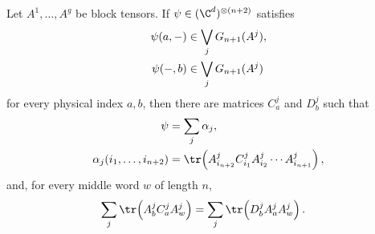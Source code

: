\begin{lemma}
    \label{lem:pgvwc07_trace_decompositions_from_block_restrictions}
    \leanok
    Let $A^1,\ldots,A^g$ be block tensors. If
    $\psi\in(\C^d)^{\otimes(n+2)}$ satisfies
    \begin{align}
        \psi(a,-) & \in\bigvee_jG_{n+1}(A^j),
        \notag                                \\
        \psi(-,b) & \in\bigvee_jG_{n+1}(A^j)
        \notag
    \end{align}
    for every physical index $a,b$, then there are matrices $C^j_a$ and
    $D^j_b$ such that
    \begin{align}
        \psi & =\sum_j\alpha_j, \notag \\
        \alpha_j(i_1,\ldots,i_{n+2})
             & =
        \tr\!\left(A^j_{i_{n+2}}C^j_{i_1}
        A^j_{i_2}\cdots A^j_{i_{n+1}}\right), \notag
    \end{align}
    and, for every middle word $w$ of length $n$,
    \begin{align}
        \sum_j\tr\!\left(A^j_bC^j_aA^j_w\right)
         & =
        \sum_j\tr\!\left(D^j_bA^j_aA^j_w\right). \notag
    \end{align}
\end{lemma}

